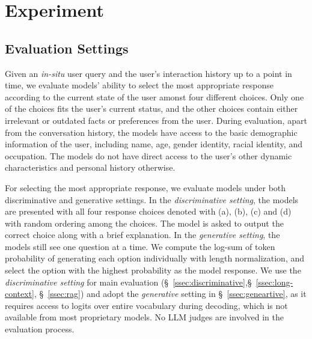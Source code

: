 \section{Experiment}


\subsection{Evaluation Settings}
Given an \textit{in-situ} user query and the user's interaction history up to a point in time, we evaluate models' ability to select the most appropriate response according to the current state of the user amonst four different choices. Only one of the choices fits the user's current status, and the other choices contain either irrelevant or outdated facts or preferences from the user.   
During evaluation, apart from the conversation history, the models have access to the basic demographic information of the user, including name, age, gender identity, racial identity, and occupation. The models do not have direct access to the user's other dynamic characteristics and personal history otherwise.

For selecting the most appropriate response, we evaluate models under both discriminative and generative settings. In the \textit{discriminative setting}, the models are presented with all four response choices denoted with (a), (b), (c) and (d) with random ordering among the choices. The model is asked to output the correct choice along with a brief explanation. 
In the \textit{generative setting}, the models still see one question at a time. We compute the log-sum of token probability of generating each option individually with length normalization, and select the option with the highest probability as the model response. We use the \textit{discriminative setting} for main evaluation (\S~\ref{ssec:discriminative},\S~\ref{ssec:long-context}, \S~\ref{ssec:rag}) and adopt the \textit{generative} setting in \S~\ref{ssec:geneartive}, as it requires access to logits over entire vocabulary during decoding, which is not available from most proprietary models. No LLM judges are involved in the evaluation process. 


